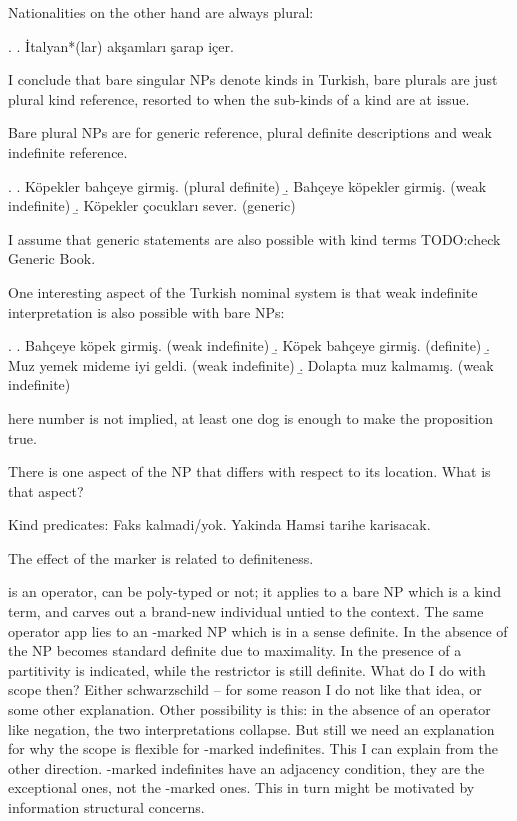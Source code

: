 \documentclass[11pt,a4paper]{article}
\begin{document}
Nationalities on the other hand are always plural:

\ex.
\a. İtalyan*(lar) akşamları şarap içer.

I conclude that bare singular NPs denote kinds in Turkish, bare plurals are just plural kind reference, resorted to when the sub-kinds of a kind are at issue.

Bare plural NPs are for generic reference, plural definite descriptions and weak indefinite reference.

\ex.
\a. Köpekler bahçeye girmiş. (plural definite)
\b. Bahçeye köpekler girmiş. (weak indefinite)
\b. Köpekler çocukları sever. (generic)

I assume that generic statements are also possible with kind terms TODO:check Generic Book.

One interesting aspect of the Turkish nominal system is that weak indefinite interpretation is also possible with bare NPs: 

\ex.
\a. Bahçeye köpek girmiş. (weak indefinite)
\b. Köpek bahçeye girmiş. (definite)
\b. Muz yemek mideme iyi geldi. (weak indefinite)
\b. Dolapta muz kalmamış. (weak indefinite)

here number is not implied, at least one dog is enough to make the proposition true.

There is one aspect of the NP that differs with respect to its location. What is that aspect?

Kind predicates:
Faks kalmadi/yok.
Yakinda Hamsi tarihe karisacak.



The effect of the marker is related to definiteness.

 is an operator, can be poly-typed or not; it applies to a bare NP which is a kind term, and carves out a brand-new individual untied to the context. The same operator app		 lies to an \acc-marked NP which is in a sense definite. In the absence of  the NP becomes standard definite due to maximality. In the presence of  a partitivity is indicated, while the restrictor is still definite. What do I do with scope then? Either schwarzschild -- for some reason I do not like that idea, or some other explanation. Other possibility is this: in the absence of an operator like negation, the two interpretations collapse. But still we need an explanation for why the scope is flexible for \acc-marked indefinites. This I can explain from the other direction. \zero-marked indefinites have an adjacency condition, they are the exceptional ones, not the \acc-marked ones. This in turn might be motivated by information structural concerns.    
\end{document}
